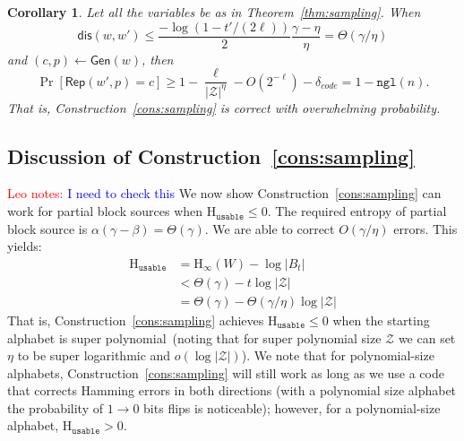 \documentclass[11pt]{article}
\newcommand{\thref}[1]{\mbox{Theorem~\ref{#1}}}
\newcommand{\consref}[1]{\mbox{Construction~\ref{#1}}}
\newcommand{\class}[1]{{\ensuremath{\mathsf{#1}}}}
\newcommand{\gen}{\ensuremath{\class{Gen}}\xspace}
\newcommand{\rep}{\ensuremath{\class{Rep}}\xspace}
\newcommand{\dis}{\ensuremath{\mathsf{dis}}}
\newcommand{\ngl}{\ensuremath{\mathtt{ngl}}\xspace}
\newcommand{\Hoo}{\mathrm{H}_\infty}
\newcommand{\Huse}{\mathrm{H}_{\mathtt{usable}}}
\newtheorem{corollary}[theorem]{Corollary}
\newcommand{\authnote}[2]{{\textcolor{red}{\textsf{#1 notes: }\textcolor{blue}{ #2}}\marginpar{\textcolor{red}{\textbf{!!!!!}}}}}
\newcommand{\authnote}[2]{}
\newcommand{\lnote}[1]{{\authnote{Leo}{#1}}}
\begin{document}
\begin{corollary}
Let all the variables be as in \thref{thm:sampling}.
When
\[
\dis(w, w')\le \frac{-\log(1-t'/(2\ell))}{2}\frac{\gamma-\eta}{\eta} = \Theta(\gamma/\eta)
\]
and $(c, p)\leftarrow \gen(w)$, then
\[
\Pr[\rep(w', p) = c] \geq 1-\frac{\ell}{|\mathcal{Z}|^\eta} - O(2^{-\ell}) -\delta_{code}= 1-\ngl(n).
\]
That is, \consref{cons:sampling} is correct with overwhelming probability.
\end{corollary}

\subsection{Discussion of \consref{cons:sampling}}
\lnote{I need to check this}
We now show \consref{cons:sampling} can work for partial block sources when $\Huse\le 0$.  The required entropy of partial block source is $\alpha (\gamma-\beta ) = \Theta(\gamma)$.  We are able to correct $O(\gamma/\eta)$ errors.
This yields:
\begin{align*}
\Huse &= \Hoo(W) -\log |B_t| \\
&< \Theta(\gamma)- t \log |\mathcal{Z}|\\
&= \Theta(\gamma) - \Theta(\gamma/\eta) \log |\mathcal{Z}|
\end{align*}
That is, \consref{cons:sampling} achieves $\Huse\le 0$ when the starting alphabet is super polynomial~(noting that for super polynomial size $\mathcal{Z}$ we can set $\eta$ to be super logarithmic and $o(\log |\mathcal{Z}|)$).  We note that for polynomial-size alphabets, \consref{cons:sampling} will still work as long as we use a code that corrects Hamming errors in both directions (with a polynomial size alphabet the probability of $1\rightarrow 0$ bits flips is noticeable); however, for a polynomial-size alphabet, $\Huse>0$.



\appendix
\end{document}
